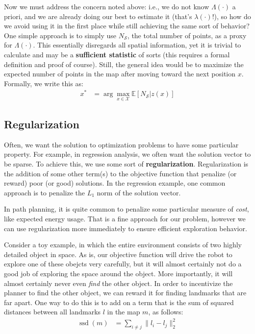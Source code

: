 \documentclass[12pt]{article}
\DeclareMathOperator{\ssd}{ssd}
\begin{document}
Now we must address the concern noted above: i.e., we do not know $\Lambda(\cdot)$ a priori, and we are already doing our best to estimate it (that's $\lambda(\cdot)$!), so how do we avoid using it in the first place while still achieving the same sort of behavior? One simple approach is to simply use $N_{\mathcal{S}}$, the total number of points, as a proxy for $\Lambda(\cdot)$. This essentially disregards all spatial information, yet it is trivial to calculate and may be a \textbf{sufficient statistic} of sorts (this requires a formal definition and proof of course). Still, the general idea would be to maximize the expected number of points in the map after moving toward the next position $x$. Formally, we write this as:
\begin{align}
  x^* &= \arg \max_{x \in \mathcal{X}} \mathbb{E}[N_{\mathcal{S}} | z(x)]
\end{align}

\subsection{Regularization}

Often, we want the solution to optimization problems to have some particular property. For example, in regression analysis, we often want the solution vector to be sparse. To achieve this, we use some sort of \textbf{regularization}. Regularization is the addition of some other term(s) to the objective function that penalize (or reward) poor (or good) solutions. In the regression example, one common approach is to penalize the $L_1$ norm of the solution vector.

In path planning, it is quite common to penalize some particular measure of \textit{cost}, like expected energy usage. That is a fine approach for our problem, however we can use regularization more immediately to ensure efficient exploration behavior.

Consider a toy example, in which the entire environment consists of two highly detailed object in space. As is, our objective function will drive the robot to explore one of these obejcts very carefully, but it will almost certainly not do a good job of exploring the space around the object. More importantly, it will almost certainly never even \textit{find} the other object. In order to incentivize the planner to find the other object, we can reward it for finding landmarks that are far apart. One way to do this is to add on a term that is the sum of squared distances between all landmarks $l$ in the map $m$, as follows:
\begin{align}
  \ssd(m) &= \sum_{i \ne j} \|l_i - l_j\|_2^2
\end{align}
\end{document}
